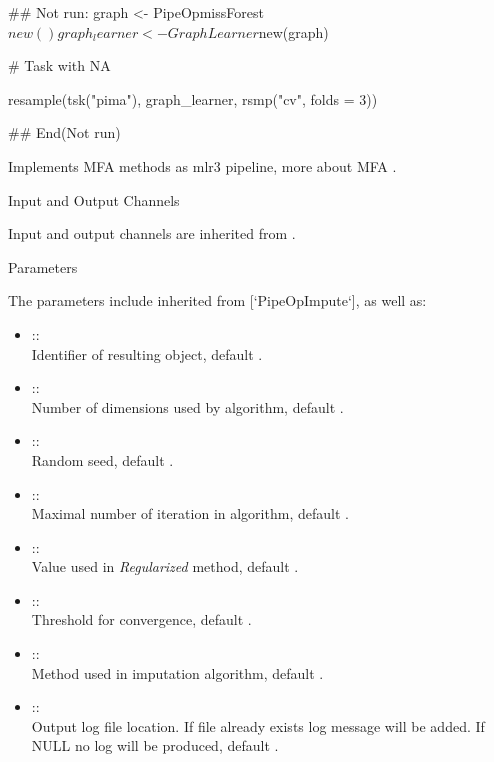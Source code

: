 \documentclass[letterpaper]{book}
\begin{document}
%
\begin{Examples}
\begin{ExampleCode}
## Not run: 
  graph <- PipeOpmissForest$new() %
  graph_learner <- GraphLearner$new(graph)

  # Task with NA

  resample(tsk("pima"), graph_learner, rsmp("cv", folds = 3))

## End(Not run)
\end{ExampleCode}
\end{Examples}
%
\begin{Description}\relax
Implements MFA methods as mlr3 pipeline, more about MFA .
\end{Description}
%
\begin{Section}{Input and Output Channels}

Input and output channels are inherited from .
\end{Section}
%
\begin{Section}{Parameters}

The parameters include inherited from [`PipeOpImpute`], as well as: \\{}
\begin{itemize}

\item{}  :: \\{}
Identifier of resulting object, default .
\item{}  :: \\{}
Number of dimensions used by algorithm, default .
\item{}  :: \\{}
Random seed, default .
\item{}  :: \\{}
Maximal number of iteration in algorithm, default .
\item{}  :: \\{}
Value used in \emph{Regularized} method, default .
\item{}  :: \\{}
Threshold for convergence, default .
\item{}  :: \\{}
Method used in imputation algorithm, default .
\item{}  :: \\{}
Output log file location. If file already exists log message will be added. If NULL no log will be produced, default .

\end{itemize}

\end{Section}
\end{document}
